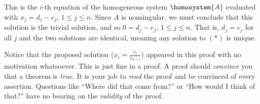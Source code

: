 %
This is the $i$-th equation of the homogeneous system $\homosystem{A}$ evaluated with $x_j=d_j-e_j$, $1\leq j\leq n$.  Since $A$ is nonsingular, we must conclude that this solution is the trivial solution, and so $0=d_j-e_j$, $1\leq j\leq n$.  That is, $d_j=e_j$ for all $j$ and the two solutions are identical, meaning any solution to $(*)$ is unique.\par\medskip
%
Notice that the proposed solution ($x_i=\frac{c_i}{c_{n+1}}$) appeared in this proof with no motivation whatsoever.  This is just fine in a proof.  A proof should {\em convince} you that a theorem is {\em true}.  It is your job to {\em read} the proof and be convinced of every assertion.  Questions like ``Where did that come from?'' or ``How would I think of that?'' have no bearing on the {\em validity} of the proof.